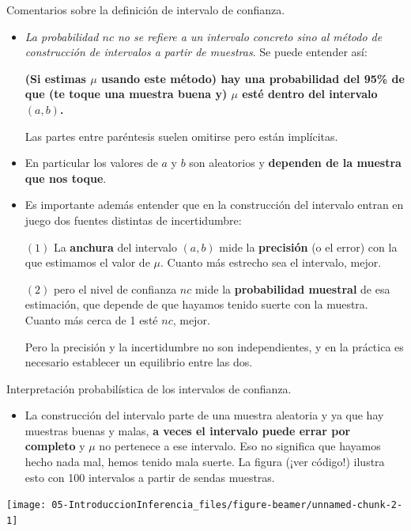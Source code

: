 \documentclass[
  9pt,
  ignorenonframetext,
]{beamer}
\providecommand{\tightlist}{%
  \setlength{\itemsep}{0pt}\setlength{\parskip}{0pt}}
\begin{document}
\begin{frame}{Comentarios sobre la definición de intervalo de
confianza.}
\protect\hypertarget{comentarios-sobre-la-definicion-de-intervalo-de-confianza.}{}

\begin{itemize}
\item
  \emph{La probabilidad \(nc\) no se refiere a un intervalo concreto
  sino al método de construcción de intervalos a partir de muestras}. Se
  puede entender así:

  \textbf{(Si estimas $\mu$ usando este método) hay una probabilidad del 95\% de que (te toque una muestra buena y) $\mu$ esté dentro del intervalo $(a, b)$.}

  Las partes entre paréntesis suelen omitirse pero están implícitas.
\item
  En particular los valores de \(a\) y \(b\) son aleatorios y
  \textbf{dependen de la muestra que nos toque}.
\item
  Es importante además entender que en la construcción del intervalo
  entran en juego dos fuentes distintas de incertidumbre:

  \((1)\) La \textbf{anchura} del intervalo \((a, b)\) mide la
  \textbf{precisión} (o el error) con la que estimamos el valor de
  \(\mu\). Cuanto más estrecho sea el intervalo, mejor.

  \((2)\) pero el nivel de confianza \(nc\) mide la \textbf{probabilidad
  muestral} de esa estimación, que depende de que hayamos tenido suerte
  con la muestra. Cuanto más cerca de 1 esté \(nc\), mejor.

  Pero la precisión y la incertidumbre no son independientes, y en la
  práctica es necesario establecer un equilibrio entre las dos.
\end{itemize}

\end{frame}

\begin{frame}{Interpretación probabilística de los intervalos de
confianza.}
\protect\hypertarget{interpretacion-probabilistica-de-los-intervalos-de-confianza.}{}

\begin{itemize}
\tightlist
\item
  La construcción del intervalo parte de una muestra aleatoria y ya que
  hay muestras buenas y malas, \textbf{a veces el intervalo puede errar
  por completo} y \(\mu\) no pertenece a ese intervalo. Eso no significa
  que hayamos hecho nada mal, hemos tenido mala suerte. La figura (¡ver
  código!) ilustra esto con 100 intervalos a partir de sendas muestras.
\end{itemize}

\begin{center}\texttt{[image: 05-IntroduccionInferencia\_files/figure-beamer/unnamed-chunk-2-1]} \end{center}

\end{frame}
\end{document}
